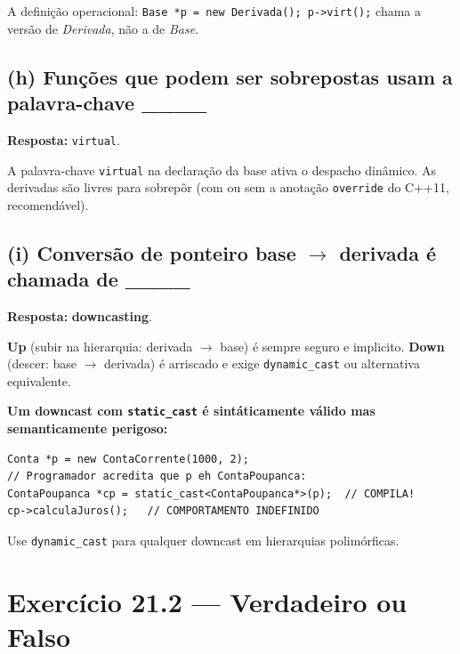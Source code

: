 \documentclass[11pt,a4paper]{article}
\begin{document}
A defini\c{c}\~ao operacional: \texttt{Base *p = new Derivada(); p->virt();} chama a vers\~ao de \emph{Derivada}, n\~ao a de \emph{Base}.

\subsection*{(h) Fun\c{c}\~oes que podem ser sobrepostas usam a palavra-chave \_\_\_\_}

\begin{resposta}\textbf{Resposta:} \texttt{virtual}.\end{resposta}

A palavra-chave \texttt{virtual} na declara\c{c}\~ao da base ativa o despacho din\^amico. As derivadas s\~ao livres para sobrep\^or (com ou sem a anota\c{c}\~ao \texttt{override} do C++11, recomend\'avel).

\subsection*{(i) Convers\~ao de ponteiro base $\to$ derivada \'e chamada de \_\_\_\_}

\begin{resposta}\textbf{Resposta:} \textbf{downcasting}.\end{resposta}

\textbf{Up} (subir na hierarquia: derivada $\to$ base) \'e sempre seguro e implicito. \textbf{Down} (descer: base $\to$ derivada) \'e arriscado e exige \texttt{dynamic\_cast} ou alternativa equivalente.

\begin{errocomum}
\textbf{Um downcast com \texttt{static\_cast} \'e sint\'aticamente v\'alido mas semanticamente perigoso:}
\begin{lstlisting}[style=cppcode,numbers=none]
Conta *p = new ContaCorrente(1000, 2);
// Programador acredita que p eh ContaPoupanca:
ContaPoupanca *cp = static_cast<ContaPoupanca*>(p);  // COMPILA!
cp->calculaJuros();   // COMPORTAMENTO INDEFINIDO
\end{lstlisting}
Use \texttt{dynamic\_cast} para qualquer downcast em hierarquias polim\'orficas.
\end{errocomum}

\section{Exerc\'icio 21.2 --- Verdadeiro ou Falso}
\end{document}
